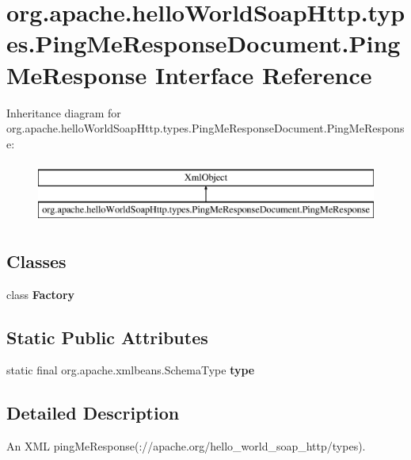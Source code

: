 \hypertarget{interfaceorg_1_1apache_1_1hello_world_soap_http_1_1types_1_1_ping_me_response_document_1_1_ping_me_response}{}\section{org.\+apache.\+hello\+World\+Soap\+Http.\+types.\+Ping\+Me\+Response\+Document.\+Ping\+Me\+Response Interface Reference}
\label{interfaceorg_1_1apache_1_1hello_world_soap_http_1_1types_1_1_ping_me_response_document_1_1_ping_me_response}
Inheritance diagram for org.\+apache.\+hello\+World\+Soap\+Http.\+types.\+Ping\+Me\+Response\+Document.\+Ping\+Me\+Response\+:\begin{figure}[H]
\begin{center}
\leavevmode
\includegraphics[height=2.000000cm]{interfaceorg_1_1apache_1_1hello_world_soap_http_1_1types_1_1_ping_me_response_document_1_1_ping_me_response}
\end{center}
\end{figure}
\subsection*{Classes}
\begin{DoxyCompactItemize}
\item 
class {\bfseries Factory}
\end{DoxyCompactItemize}
\subsection*{Static Public Attributes}
\begin{DoxyCompactItemize}
\item 
static final org.\+apache.\+xmlbeans.\+Schema\+Type {\bfseries type}
\end{DoxyCompactItemize}


\subsection{Detailed Description}
An X\+M\+L ping\+Me\+Response(\+://apache.org/hello\+\_\+world\+\_\+soap\+\_\+http/types).

